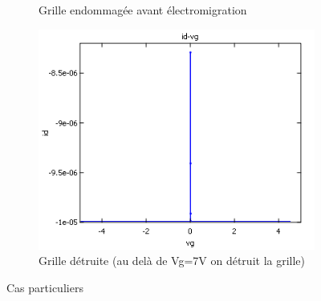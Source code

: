 \begin{figure}[h]
\begin{subfigure}[b]{0.28\textwidth}
        \caption{Grille endommagée avant électromigration}
    \end{subfigure}
    \quad
    \begin{subfigure}[b]{0.28\textwidth}
        \includegraphics[width=\textwidth]{Images/Grille_Detruite}
        \caption{Grille détruite (au delà de Vg=7V on détruit la grille)}
    \end{subfigure}
    \caption{Cas particuliers}
\end{figure}

